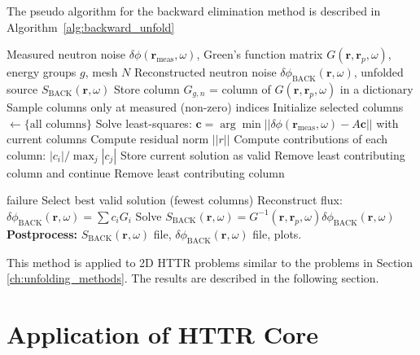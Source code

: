 The pseudo algorithm for the backward elimination method is described in Algorithm~\ref{alg:backward_unfold}
\begin{algorithm}[H]
\caption{: Backward Elimination Method}
\label{alg:backward_unfold}
\begin{algorithmic}[1]
\Require Measured neutron noise $\delta \phi(\textbf{r}_{\text{meas}}, \omega)$, Green’s function matrix $G(\textbf{r}, \textbf{r}_p,\omega)$, energy groups $g$, mesh $N$
\Ensure Reconstructed neutron noise $\delta \phi_{\text{BACK}}(\textbf{r}, \omega)$, unfolded source $S_{\text{BACK}}(\textbf{r}, \omega)$
 
        \State Store column $G_{g,n}$ = column of $G(\textbf{r}, \textbf{r}_p,\omega)$ in a dictionary
    \EndFor
\EndFor
\State Sample columns only at measured (non-zero) indices
\State Initialize selected columns $\gets \{ \text{all columns} \}$
 
    \State Solve least-squares: $\mathbf{c} = \arg\min ||\delta \phi(\textbf{r}_{\text{meas}}, \omega) - A \mathbf{c}||$ with current columns
    \State Compute residual norm $||r||$
    \State Compute contributions of each column: $|c_i| / \max_j |c_j|$
        \State Store current solution as valid
        \State Remove least contributing column and continue
    \Else
        \State Remove least contributing column
    \EndIf
\EndWhile

  
    \State \Return failure
\Else
    \State Select best valid solution (fewest columns)
    \State Reconstruct flux: $\delta \phi_{\text{BACK}}(\textbf{r}, \omega) = \sum c_i G_{i}$
\EndIf
\State Solve $S_{\text{BACK}}(\textbf{r}, \omega) = G^{-1}(\textbf{r}, \textbf{r}_p,\omega) \delta \phi_\text{BACK}(\textbf{r}, \omega)$
\State \textbf{Postprocess:} $S_{\text{BACK}}(\textbf{r}, \omega)$ file, $\delta \phi_\text{BACK}(\textbf{r}, \omega)$ file, plots. 
\end{algorithmic}
\end{algorithm}

This method is applied to 2D HTTR problems similar to the problems in Section \ref{ch:unfolding_methods}. The results are described in the following section.

\section{Application of HTTR Core}


